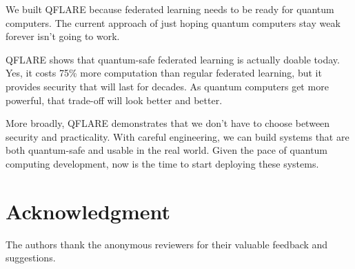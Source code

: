 \documentclass[journal]{IEEEtran}
\begin{document}
We built QFLARE because federated learning needs to be ready for quantum computers. The current approach of just hoping quantum computers stay weak forever isn't going to work.

QFLARE shows that quantum-safe federated learning is actually doable today. Yes, it costs 75\% more computation than regular federated learning, but it provides security that will last for decades. As quantum computers get more powerful, that trade-off will look better and better.

More broadly, QFLARE demonstrates that we don't have to choose between security and practicality. With careful engineering, we can build systems that are both quantum-safe and usable in the real world. Given the pace of quantum computing development, now is the time to start deploying these systems.

\section*{Acknowledgment}

The authors thank the anonymous reviewers for their valuable feedback and suggestions.
\end{document}
